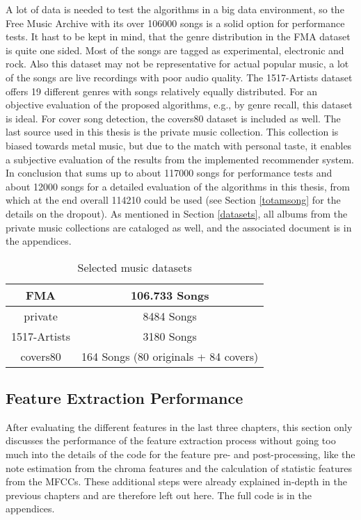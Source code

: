 A lot of data is needed to test the algorithms in a big data environment, so the Free Music Archive with its over 106000 songs is a solid option for performance tests. It hast to be kept in mind, that the genre distribution in the FMA dataset is quite one sided. Most of the songs are tagged as experimental, electronic and rock. Also this dataset may not be representative for actual popular music, a lot of the songs are live recordings with poor audio quality. %
The 1517-Artists dataset offers 19 different genres with songs relatively equally distributed. For an objective evaluation of the proposed algorithms, e.g., by genre recall, this dataset is ideal. For cover song detection, the covers80 dataset is included as well.
The last source used in this thesis is the private music collection. This collection is biased towards metal music, but due to the match with personal taste, it enables a subjective evaluation of the results from the implemented recommender system.\\ 
In conclusion that sums up to about 117000 songs for performance tests and about 12000 songs for a detailed evaluation of the algorithms in this thesis, from which at the end overall 114210 could be used (see Section \ref{totamsong} for the details on the dropout). As mentioned in Section \ref{datasets}, all albums from the private music collections are cataloged as well, and the associated document is in the appendices. 

\begin{table}[h]
	\label{used_dsets}
	\begin{center}
		\begin{tabular}{|c||c|}
			\hline
			FMA & 106.733 Songs\\
			\hline
			private & 8484 Songs\\
			\hline
			1517-Artists & 3180 Songs\\
			\hline
			covers80 & 164 Songs (80 originals + 84 covers)\\
			\hline
		\end{tabular}
	\end{center}
	\caption{Selected music datasets}
\end{table}
\FloatBarrier

\subsection{Feature Extraction Performance}

After evaluating the different features in the last three chapters, this section only discusses the performance of the feature extraction process without going too much into the details of the code for the feature pre- and post-processing, like the note estimation from the chroma features and the calculation of statistic features from the MFCCs. These additional steps were already explained in-depth in the previous chapters and are therefore left out here. The full code is in the appendices. 

